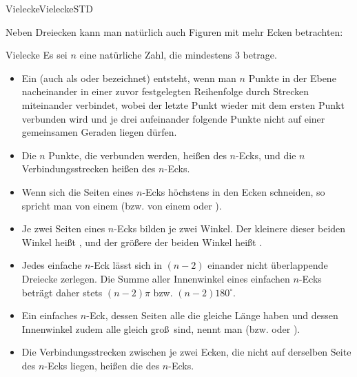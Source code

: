 \begin{MXContent}{Vielecke}{Vielecke}{STD}

Neben Dreiecken kann man nat\"urlich auch Figuren mit mehr Ecken betrachten:

\begin{MXInfo}{Vielecke}%
Es sei $n$ eine nat\"urliche Zahl, die mindestens $3$ betrage.
\begin{itemize}
 \item 
Ein  (auch als  oder  bezeichnet) entsteht,
      wenn man $n$ Punkte in der Ebene nacheinander in einer zuvor festgelegten Reihenfolge durch Strecken miteinander verbindet,
			wobei der letzte Punkt wieder mit dem ersten Punkt verbunden wird und je drei aufeinander folgende Punkte nicht auf einer gemeinsamen Geraden
			liegen d\"urfen.
       
 \item Die $n$ Punkte, die verbunden werden, hei\ss en
        des $n$-Ecks, und
       die $n$ Verbindungsstrecken hei\ss en
        des $n$-Ecks.
   \item Wenn sich die Seiten eines $n$-Ecks h\"ochstens in den Ecken schneiden, so spricht man von einem  (bzw. von einem  oder ).  
 \item Je zwei Seiten eines $n$-Ecks bilden je zwei Winkel.
Der kleinere dieser beiden Winkel hei\ss t
,
       und der gr\"o\ss ere der beiden Winkel hei\ss t
       .
		\item Jedes einfache $n$-Eck l\"asst sich in $(n-2)$ einander nicht \"uberlappende Dreiecke zerlegen. Die Summe aller Innenwinkel eines einfachen $n$-Ecks betr\"agt daher stets $(n-2)\pi$ bzw. $(n-2)180^\circ$.
 \item Ein einfaches $n$-Eck, dessen Seiten alle die gleiche L\"ange haben und dessen Innenwinkel zudem alle gleich gro\ss\ sind, nennt man
 (bzw.  oder ).
\item Die Verbindungsstrecken zwischen je zwei Ecken, die nicht auf derselben Seite des $n$-Ecks liegen, hei\ss en die  des $n$-Ecks.
\end{itemize}
\end{MXInfo}


\end{MXContent}
